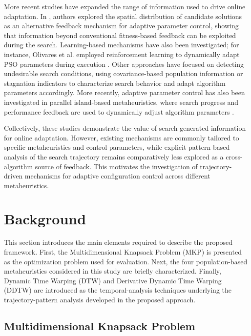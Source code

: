 \documentclass[journal,article,submit,moreauthors]{Definitions/mdpi}
\begin{document}
More recent studies have expanded the range of information used to drive
online adaptation. In \cite{yang2022spatial}, authors explored the spatial distribution of candidate
solutions as an alternative feedback mechanism for adaptive parameter control,
showing that information beyond conventional fitness-based feedback can be
exploited during the search. Learning-based mechanisms
have also been investigated; for instance, Olivares et al. employed
reinforcement learning to dynamically adapt PSO parameters during execution
\cite{olivares2023learning}. Other approaches have focused on detecting
undesirable search conditions, using covariance-based population information
\cite{song2024differential} or stagnation indicators \cite{liu2024adaptive} to characterize search behavior and adapt algorithm parameters accordingly. More recently,
adaptive parameter control has also been investigated in parallel island-based
metaheuristics, where search progress and performance feedback are used to
dynamically adjust algorithm parameters \cite{prado2025parameter}.

Collectively, these studies demonstrate the value of search-generated
information for online adaptation. However, existing mechanisms are commonly
tailored to specific metaheuristics and control parameters, while explicit
pattern-based analysis of the search trajectory remains comparatively less
explored as a cross-algorithm source of feedback. This motivates the
investigation of trajectory-driven mechanisms for adaptive configuration
control across different metaheuristics.

\section{Background}

This section introduces the main elements required to describe the proposed
framework. First, the Multidimensional Knapsack Problem (MKP) is presented as
the optimization problem used for evaluation. Next, the four population-based
metaheuristics considered in this study are briefly characterized. Finally,
Dynamic Time Warping (DTW) and Derivative Dynamic Time Warping (DDTW) are
introduced as the temporal-analysis techniques underlying the trajectory-pattern
analysis developed in the proposed approach.

\subsection{Multidimensional Knapsack Problem}
\end{document}

